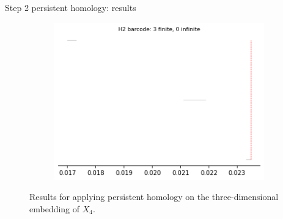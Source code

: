 \documentclass[xcolor={dvipsnames,svgnames}]{beamer}
\begin{document}
\begin{frame}{Step 2 persistent homology: results}
\begin{figure}[H]
\begin{subfigure}[b]{0.2\textwidth}
\includegraphics[width=\textwidth]{figures/X4_H2_barcode.png}
 \caption{}
\end{subfigure}
\caption{Results for applying persistent homology on the three-dimensional embedding of $X_4$.}
\end{figure}
\end{frame}
\end{document}
